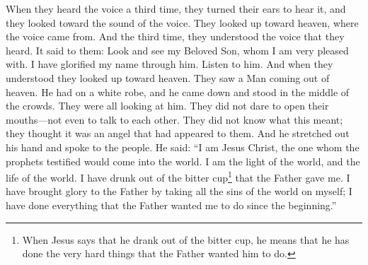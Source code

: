 \bverse \iffalse And again the third time they did hear the voice, and did open their ears to hear it; and their eyes were towards the sound thereof; and they did look steadfastly towards heaven, from whence the sound came. \fi
When they heard the voice a third time, they turned their ears to hear it, and they looked toward the sound of the voice. They looked up toward heaven, where the voice came from.
\bverse \iffalse And behold, the third time they did understand the voice which they heard; and it said unto them: \fi
And the third time, they understood the voice that they heard. It said to them:
\bverse \iffalse Behold my Beloved Son, in whom I am well pleased, in whom I have glorified my name--hear ye him. \fi
Look and see my Beloved Son, whom I am very pleased with. I have glorified my name through him. Listen to him.
\bverse \iffalse And it came to pass, as they understood they cast their eyes up again towards heaven; and behold, they saw a Man descending out of heaven; and he was clothed in a white robe; and he came down and stood in the midst of them; and the eyes of the whole multitude were turned upon him, and they durst not open their mouths, even one to another, and wist not what it meant, for they thought it was an angel that had appeared unto them. \fi
And when they understood they looked up toward heaven. They saw a Man coming out of heaven. He had on a white robe, and he came down and stood in the middle of the crowds. They were all looking at him. They did not dare to open their mouths---not even to talk to each other. They did not know what this meant; they thought it was an angel that had appeared to them.
\bverse \iffalse And it came to pass that he stretched forth his hand and spake unto the people, saying: \fi
And he stretched out his hand and spoke to the people. He said:
\bverse \iffalse Behold, I am Jesus Christ, whom the prophets testified shall come into the world. \fi
``I am Jesus Christ, the one whom the prophets testified would come into the world.
\bverse \iffalse And behold, I am the light and the life of the world; and I have drunk out of that bitter cup which the Father hath given me, and have glorified the Father in taking upon me the sins of the world, in the which I have suffered the will of the Father in all things from the beginning. \fi
I am the light of the world, and the life of the world. I have drunk out of the bitter cup\footnote{When Jesus says that he drank out of the bitter cup, he means that he has done the very hard things that the Father wanted him to do.} that the Father gave me. I have brought glory to the Father by taking all the sins of the world on myself; I have done everything that the Father wanted me to do since the beginning.''
